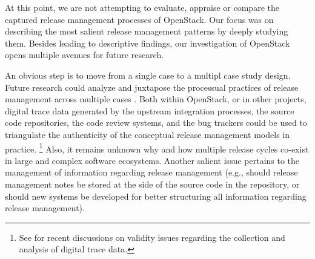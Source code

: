 \documentclass[dvipsnames]{interact}
\theoremstyle{plain}\newtheorem{theorem}{Theorem}[section]
\theoremstyle{definition}
\theoremstyle{remark}
\begin{document}
                                                                                                                                                      
 







At this point, we are not attempting to evaluate, appraise or compare the captured release management processes of OpenStack. Our focus was on describing the most salient release management patterns by deeply studying them. Besides leading to descriptive findings, our investigation of OpenStack opens multiple avenues for future research. 

An obvious step is to move from a single case to a multipl case study design. Future research could analyze and juxtapose the processual practices of release management across multiple cases \citep{MichlmayrFitzgerald_et_al2015,PooCaamano2016}. Both within OpenStack, or in other projects, digital trace data generated by the upstream integration processes, the source code repositories, the code review systems, and the bug trackers could be used to triangulate the authenticity of the conceptual release management models in practice. \footnote{See \citep{HowisonWiggins_et_al2012,HedmanSrinivasan_et_al2013,Freelon2014,RuthsPfeffer2014,Crowston2017} 
for recent discussions on validity issues regarding the collection and analysis of digital trace data.} 
Also, it remains unknown why and how multiple release cycles co-exist in large and complex software ecosystems. Another salient issue pertains to the management of information regarding release management (e.g., should release management notes be stored at the side of the source code in the repository, or should new systems be developed for better structuring all information regarding release management).
\end{document}
